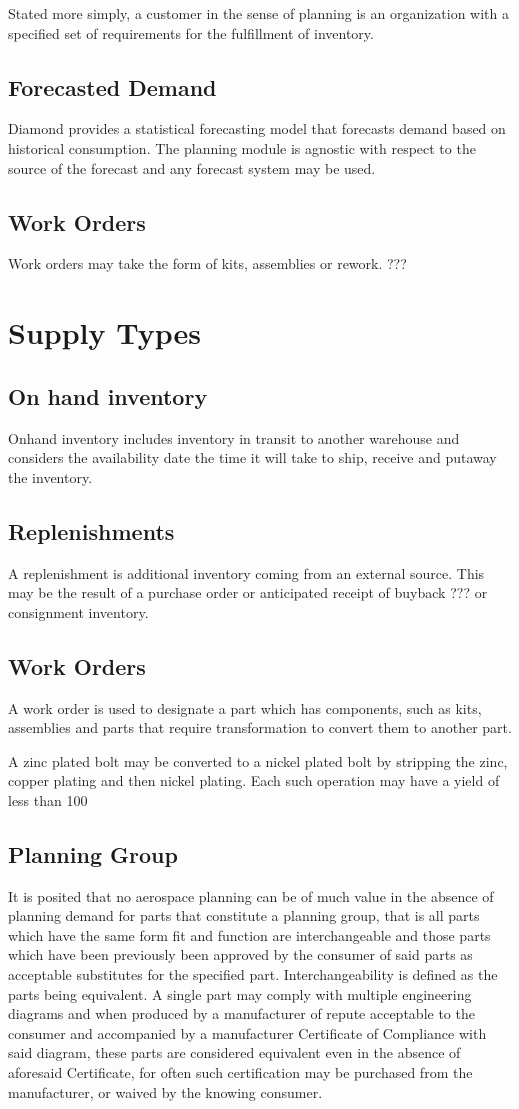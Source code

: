 Stated more simply, a customer in the sense of planning is an organization with a specified set of requirements
for the fulfillment of inventory.
\subsection{Forecasted Demand}
Diamond provides a statistical forecasting model that forecasts demand based on historical consumption.
The planning module is agnostic with respect to the source of the forecast and any forecast system may be used.
\subsection{Work Orders}
Work orders may take the form of kits, assemblies or rework.  ???


\section{Supply Types}
\subsection{On hand inventory}
Onhand inventory includes inventory in transit to another warehouse and considers the availability date
the time it will take to ship, receive and putaway the inventory.
\subsection{Replenishments} 
A replenishment is additional inventory coming from an external source. This may be the result of a purchase order
or anticipated receipt of buyback ??? or consignment inventory. 
\subsection{Work Orders}
A work order is used to designate a part which has components, such as kits, assemblies and parts that require
transformation to convert them to another part.  

A zinc plated bolt may be converted to a nickel plated bolt by stripping the zinc, copper plating and then nickel plating.
Each such operation may have a yield of less than 100%
\subsection{Planning Group}
It is posited that no aerospace planning can be of much value in the absence of planning demand for parts that 
constitute a planning group, that is all parts which have the same form fit and function are interchangeable and 
those parts which have been previously been approved by the consumer of said parts as acceptable substitutes for
the specified part.  
Interchangeability is defined as the parts being equivalent. A single part may comply with multiple engineering
diagrams and when produced by a manufacturer of repute acceptable to the consumer and accompanied by a
manufacturer Certificate of Compliance with said diagram, these parts are considered equivalent even in the 
absence of aforesaid Certificate, for often such certification may be purchased from the manufacturer, or waived
by the knowing consumer.
